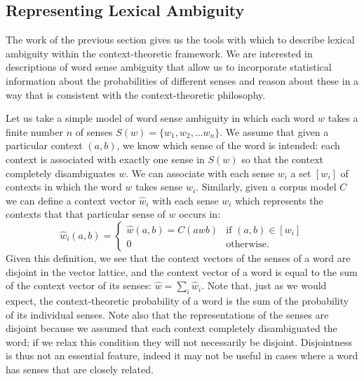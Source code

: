 

\subsection{Representing Lexical Ambiguity}

The work of the previous section gives us the tools with which to describe lexical ambiguity within the context-theoretic framework. We are interested in descriptions of word sense ambiguity that allow us to incorporate statistical information about the probabilities of different senses and reason  about these in a way that is consistent with the context-theoretic philosophy.

Let us take a simple model of word sense ambiguity in which each word $w$ takes a finite number $n$ of senses $S(w) = \{w_1, w_2, \ldots w_n\}$. We assume that given a particular context $(a,b)$, we know which sense of the word is intended: each context is associated with exactly one sense in $S(w)$ so that the context completely disambiguates $w$. We can associate with each sense $w_i$ a set $[w_i]$ of contexts in which the word $w$ takes sense $w_i$. Similarly, given a corpus model $C$ we can define a context vector $\hat{w}_i$ with each sense $w_i$ which represents the contexts that that particular sense of $w$ occurs in:
$$\hat{w}_i(a,b) = \begin{cases}
\hat{w}(a,b) = C(awb) & \text{if } (a,b) \in [w_i]\\
0 & \text{otherwise.}
\end{cases}$$
Given this definition, we see that the context vectors of the senses of a word are disjoint in the vector lattice, and the context vector of a word is equal to the sum of the context vector of its senses: $\hat{w} = \sum_{i} \hat{w}_i$. Note that, just as we would expect, the context-theoretic probability of a word is the sum of the probability of its individual senses. Note also that the representations of the senses are disjoint because we assumed that each context completely disambiguated the word; if we relax this condition they will not necessarily be disjoint. Disjointness is thus not an essential feature, indeed it may not be useful in cases where a word has senses that are closely related.


